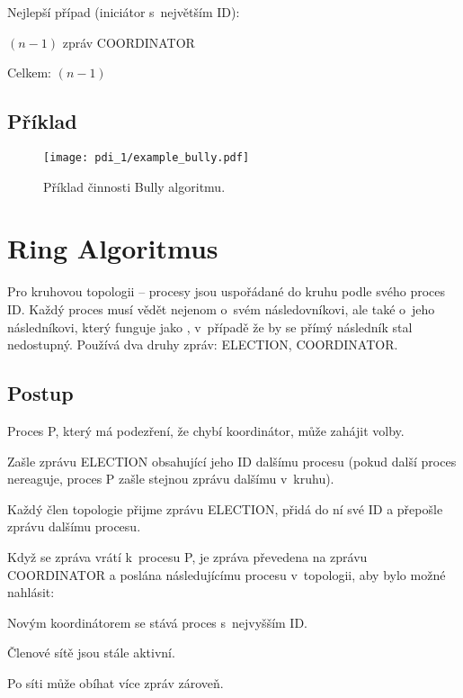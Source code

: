 \noindent Nejlepší případ (iniciátor s~největším ID):

\begin{compactitem}
    \item $(n-1)$ zpráv COORDINATOR
    \item Celkem: $(n-1)$
\end{compactitem}

\subsection*{Příklad}

\begin{figure}[H]
    \centering
    \texttt{[image: pdi\_1/example\_bully.pdf]}
    \caption{Příklad činnosti Bully algoritmu.}
\end{figure}


\section{Ring Algoritmus}

Pro kruhovou topologii -- procesy jsou uspořádané do kruhu podle svého proces ID.
Každý proces musí vědět nejenom o~svém následovníkovi, ale také o~jeho následníkovi, který funguje jako , v~případě že by se přímý následník stal nedostupný. Používá dva druhy zpráv: ELECTION, COORDINATOR.

\subsection*{Postup}

\begin{compactitem}
    \item Proces P, který má podezření, že chybí koordinátor, může zahájit volby.
    \begin{compactenum}
        \item Zašle zprávu ELECTION obsahující jeho ID dalšímu procesu (pokud další proces nereaguje, proces P zašle stejnou zprávu dalšímu v~kruhu).
        \item Každý člen topologie přijme zprávu ELECTION, přidá do ní své ID a přepošle zprávu dalšímu procesu.
    \end{compactenum}
    \item Když se zpráva vrátí k~procesu P, je zpráva převedena na zprávu  COORDINATOR a poslána následujícímu procesu v~topologii, aby bylo možné nahlásit:
    \begin{compactenum}
        \item Novým koordinátorem se stává proces s~nejvyšším ID.
        \item Členové sítě jsou stále aktivní.
    \end{compactenum}
    \item Po síti může obíhat více zpráv zároveň.
\end{compactitem}

